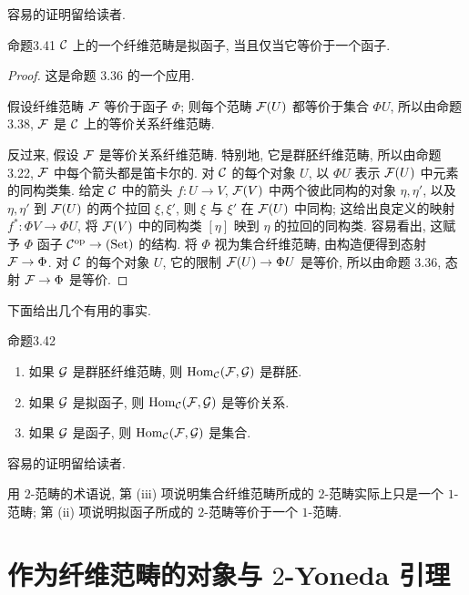 容易的证明留给读者.

\begin{origstatement}{命题}{3.41}\label{ch03:prop341}
$\mathcal C$ 上的一个纤维范畴是拟函子, 当且仅当它等价于一个函子.
\end{origstatement}
\begin{proof}
这是命题 3.36 的一个应用.

假设纤维范畴 $\mathcal F$ 等价于函子 $\Phi$; 则每个范畴 $\mathcal F(U)$ 都等价于集合 $\Phi U$, 所以由命题 3.38, $\mathcal F$ 是 $\mathcal C$ 上的等价关系纤维范畴.

反过来, 假设 $\mathcal F$ 是等价关系纤维范畴. 特别地, 它是群胚纤维范畴, 所以由命题 3.22, $\mathcal F$ 中每个箭头都是笛卡尔的. 对 $\mathcal C$ 的每个对象 $U$, 以 $\Phi U$ 表示 $\mathcal F(U)$ 中元素的同构类集. 给定 $\mathcal C$ 中的箭头 $f:U\to V$, $\mathcal F(V)$ 中两个彼此同构的对象 $\eta,\eta'$, 以及 $\eta,\eta'$ 到 $\mathcal F(U)$ 的两个拉回 $\xi,\xi'$, 则 $\xi$ 与 $\xi'$ 在 $\mathcal F(U)$ 中同构; 这给出良定义的映射 $f^*:\Phi V\to\Phi U$, 将 $\mathcal F(V)$ 中的同构类 $[\eta]$ 映到 $\eta$ 的拉回的同构类. 容易看出, 这赋予 $\Phi$ 函子 $\mathcal C^{\mathrm{op}}\to(\mathrm{Set})$ 的结构. 将 $\Phi$ 视为集合纤维范畴, 由构造便得到态射 $\mathcal F\to\Phi$. 对 $\mathcal C$ 的每个对象 $U$, 它的限制 $\mathcal F(U)\to\Phi U$ 是等价, 所以由命题 3.36, 态射 $\mathcal F\to\Phi$ 是等价.
\end{proof}

下面给出几个有用的事实.

\begin{origstatement}{命题}{3.42}\label{ch03:prop342}
\begin{enumerate}
\item[(i)] 如果 $\mathcal G$ 是群胚纤维范畴, 则 $\operatorname{Hom}_{\mathcal C}(\mathcal F,\mathcal G)$ 是群胚.
\item[(ii)] 如果 $\mathcal G$ 是拟函子, 则 $\operatorname{Hom}_{\mathcal C}(\mathcal F,\mathcal G)$ 是等价关系.
\item[(iii)] 如果 $\mathcal G$ 是函子, 则 $\operatorname{Hom}_{\mathcal C}(\mathcal F,\mathcal G)$ 是集合.
\end{enumerate}
\end{origstatement}

容易的证明留给读者.

用 $2$-范畴的术语说, 第 (iii) 项说明集合纤维范畴所成的 $2$-范畴实际上只是一个 $1$-范畴; 第 (ii) 项说明拟函子所成的 $2$-范畴等价于一个 $1$-范畴.

\section[作为纤维范畴的对象与 2-Yoneda 引理]{作为纤维范畴的对象与 $2$-Yoneda 引理}
\label{ch03:sec36}
